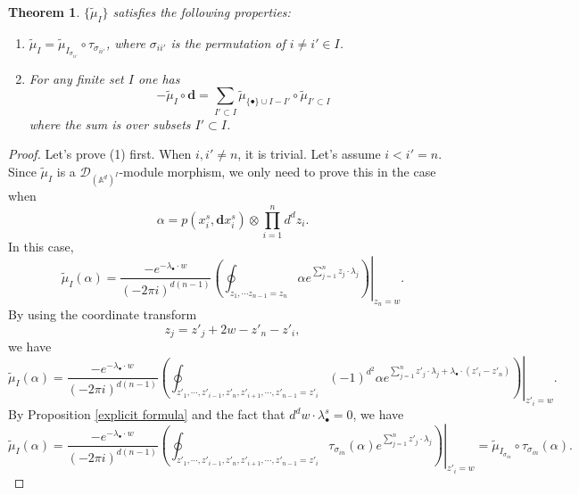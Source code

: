 \documentclass[11pt]{amsart}
\newtheorem{thm}{Theorem}[section]
\theoremstyle{definition}
\theoremstyle{remark}
\numberwithin{equation}{section}
\begin{document}
\begin{thm}
    $\{\tilde{\mu}_{ I}\}$ satisfies the following properties:
    \begin{enumerate}
        \item $\tilde{\mu}_{ I}=\tilde{\mu}_{ I_{\sigma_{ii'}}}\circ\tau_{\sigma_{ii'}}$, where $\sigma_{ii'}$ is the permutation of $i\neq i'\in I$.
        \item For any finite set $I$ one has 
        $$
        -\tilde{\mu}_{ I}\circ \mathbf{d}=\sum_{ I'\subset I}\tilde{\mu}_{\{\bullet\}\cup I- I'}\circ \tilde{\mu}_{ I'\subset I}
        $$
        where the sum is over subsets $I' \subset I$.
    \end{enumerate}
\end{thm}
\begin{proof}
    Let's prove (1) first. When $i,i'\neq n$, it is trivial. Let's assume $i<i'=n$. Since $\tilde{\mu}_{ I}$ is a $\mathcal{D}_{(\mathbb{A}^{d})^{ I}}$-module morphism, we only need to prove this in the case when 
    $$
    \alpha=p(x_{i}^{s},\mathbf{d}x_{i}^{s})\otimes\prod_{i=1}^{n}d^{d}z_{i}.
    $$
    In this case,
    $$
    \tilde{\mu}_{ I}(\alpha)=\frac{-e^{-\lambda_{\bullet}\cdot w}}{(-2\pi i)^{d(n-1)}}\left.\left(\oint_{z_{1},\cdots z_{n-1}=z_{n}}\alpha e^{\sum_{j=1}^{n}z_{j}\cdot \lambda_{j}}\right)\right|_{z_{n}=w}.
    $$
    By using the coordinate transform
    $$
    z_{j}=z'_{j}+2w-z'_{n}-z'_{i},
    $$
    we have 
    $$
    \tilde{\mu}_{ I}(\alpha)=\frac{-e^{-\lambda_{\bullet}\cdot w}}{(-2\pi i)^{d(n-1)}}\left.\left(\oint_{z'_{1},\cdots, z'_{i-1},z'_{n}, z'_{i+1},\cdots, z'_{n-1}=z'_{i}}(-1)^{d^2}\alpha e^{\sum_{j=1}^{n}z'_{j}\cdot \lambda_{j}+\lambda_{\bullet}\cdot(z'_i-z'_n)}\right)\right|_{z'_{i}=w}.
    $$
    By Proposition \ref{explicit formula} and the fact that $d^{d}w\cdot\lambda_{\bullet}^{s}=0$, we have
    $$
    \tilde{\mu}_{ I}(\alpha)=\frac{-e^{-\lambda_{\bullet}\cdot w}}{(-2\pi i)^{d(n-1)}}\left.\left(\oint_{z'_{1},\cdots, z'_{i-1},z'_{n}, z'_{i+1},\cdots, z'_{n-1}=z'_{i}}\tau_{\sigma_{in}}(\alpha) e^{\sum_{j=1}^{n}z'_{j}\cdot \lambda_{j}}\right)\right|_{z'_{i}=w}=\tilde{\mu}_{ I_{\sigma_{in}}}\circ\tau_{\sigma_{in}}(\alpha).
    $$


\end{proof}
\end{document}
